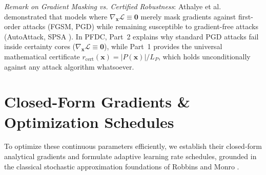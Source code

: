 \documentclass[times, review, 10pt]{elsarticle}
\begin{document}
\textit{Remark on Gradient Masking vs. Certified Robustness}:
Athalye et al. \cite{athalye2018obfuscated} demonstrated that models where $\nabla_{\mathbf{x}} \mathcal{L} \equiv \mathbf{0}$ merely mask gradients against first-order attacks (FGSM, PGD) while remaining susceptible to gradient-free attacks (AutoAttack, SPSA \cite{croce2020reliable}). In PFDC, Part~2 explains why standard PGD attacks fail inside certainty cores ($\nabla_{\mathbf{x}} \mathcal{L} \equiv \mathbf{0}$), while Part~1 provides the universal mathematical certificate $r_{\mathrm{cert}}(\mathbf{x}) = |P(\mathbf{x})|/L_P$, which holds unconditionally against any attack algorithm whatsoever.

\section{Closed-Form Gradients \& Optimization Schedules}
\label{sec:gradients}
To optimize these continuous parameters efficiently, we establish their closed-form analytical gradients and formulate adaptive learning rate schedules, grounded in the classical stochastic approximation foundations of Robbins and Monro \cite{robbins1951stochastic}.
\end{document}
